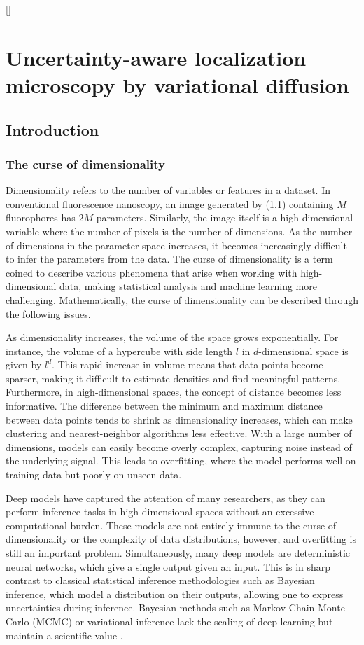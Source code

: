 []

\chapter{Uncertainty-aware localization microscopy by variational diffusion}

\section{Introduction}

\subsection{The curse of dimensionality}

Dimensionality refers to the number of variables or features in a dataset. In conventional fluorescence nanoscopy, an image generated by (1.1) containing $M$ fluorophores has $2M$ parameters. Similarly, the image itself is a high dimensional variable where the number of pixels is the number of dimensions. As the number of dimensions in the parameter space increases, it becomes increasingly difficult to infer the parameters from the data. The curse of dimensionality is a term coined to describe various phenomena that arise when working with high-dimensional data, making statistical analysis and machine learning more challenging. Mathematically, the curse of dimensionality can be described through the following issues.

As dimensionality increases, the volume of the space grows exponentially. For instance, the volume of a hypercube with side length $l$ in $d$-dimensional space is given by $l^d$. This rapid increase in volume means that data points become sparser, making it difficult to estimate densities and find meaningful patterns. Furthermore, in high-dimensional spaces, the concept of distance becomes less informative. The difference between the minimum and maximum distance between data points tends to shrink as dimensionality increases, which can make clustering and nearest-neighbor algorithms less effective. With a large number of dimensions, models can easily become overly complex, capturing noise instead of the underlying signal. This leads to overfitting, where the model performs well on training data but poorly on unseen data.

Deep models have captured the attention of many researchers, as they can perform inference tasks in high dimensional spaces without an excessive computational burden. These models are not entirely immune to the curse of dimensionality or the complexity of data distributions, however, and overfitting is still an important problem. Simultaneously, many deep models are deterministic neural networks, which give a single output given an input. This is in sharp contrast to classical statistical inference methodologies such as Bayesian inference, which model a distribution on their outputs, allowing one to express uncertainties during inference. Bayesian methods such as Markov Chain Monte Carlo (MCMC) or variational inference lack the scaling of deep learning but maintain a scientific value \parencite{Kingma2013}.

